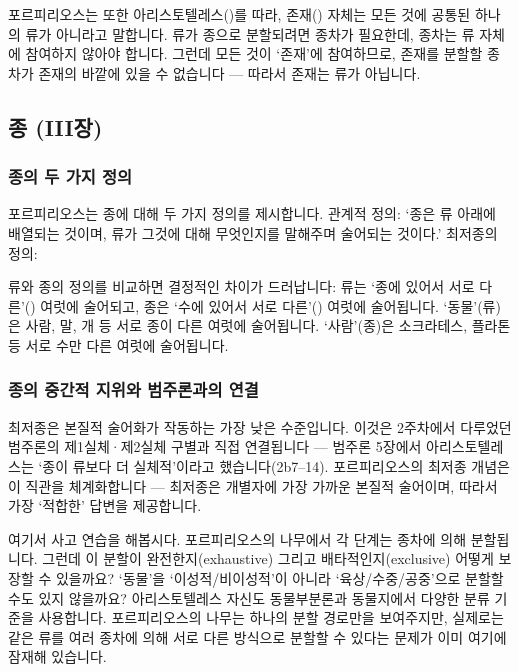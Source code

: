 \documentclass[12pt, a4paper]{article}
\begin{document}
포르피리오스는 또한 아리스토텔레스()를 따라, 존재() 자체는 모든 것에 공통된 하나의 류가 아니라고 말합니다. 류가 종으로 분할되려면 종차가 필요한데, 종차는 류 자체에 참여하지 않아야 합니다. 그런데 모든 것이 `존재'에 참여하므로, 존재를 분할할 종차가 존재의 바깥에 있을 수 없습니다 --- 따라서 존재는 류가 아닙니다.

\subsection{종 (III장)}

\subsubsection{종의 두 가지 정의}

포르피리오스는 종에 대해 두 가지 정의를 제시합니다. 관계적 정의: `종은 류 아래에 배열되는 것이며, 류가 그것에 대해 무엇인지를 말해주며 술어되는 것이다.' 최저종의 정의:


류와 종의 정의를 비교하면 결정적인 차이가 드러납니다: 류는 `종에 있어서 서로 다른'() 여럿에 술어되고, 종은 `수에 있어서 서로 다른'() 여럿에 술어됩니다. `동물'(류)은 사람, 말, 개 등 서로 종이 다른 여럿에 술어됩니다. `사람'(종)은 소크라테스, 플라톤 등 서로 수만 다른 여럿에 술어됩니다.

\subsubsection{종의 중간적 지위와 범주론과의 연결}

최저종은 본질적 술어화가 작동하는 가장 낮은 수준입니다. 이것은 2주차에서 다루었던 범주론의 제1실체·제2실체 구별과 직접 연결됩니다 --- 범주론 5장에서 아리스토텔레스는 `종이 류보다 더 실체적'이라고 했습니다(2b7--14). 포르피리오스의 최저종 개념은 이 직관을 체계화합니다 --- 최저종은 개별자에 가장 가까운 본질적 술어이며, 따라서 가장 `적합한' 답변을 제공합니다.

여기서 사고 연습을 해봅시다. 포르피리오스의 나무에서 각 단계는 종차에 의해 분할됩니다. 그런데 이 분할이 완전한지(exhaustive) 그리고 배타적인지(exclusive) 어떻게 보장할 수 있을까요? `동물'을 `이성적/비이성적'이 아니라 `육상/수중/공중'으로 분할할 수도 있지 않을까요? 아리스토텔레스 자신도 동물부분론과 동물지에서 다양한 분류 기준을 사용합니다. 포르피리오스의 나무는 하나의 분할 경로만을 보여주지만, 실제로는 같은 류를 여러 종차에 의해 서로 다른 방식으로 분할할 수 있다는 문제가 이미 여기에 잠재해 있습니다.
\end{document}

